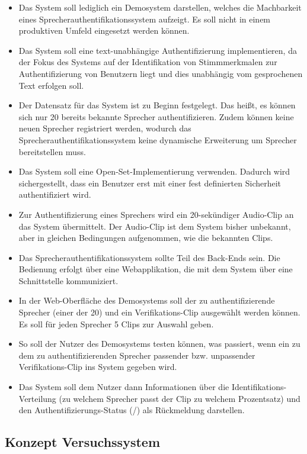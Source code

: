 \begin{itemize}
    \item Das System soll lediglich ein Demosystem darstellen, welches die Machbarkeit eines Sprecherauthentifikationssystem aufzeigt. Es soll nicht in einem produktiven Umfeld eingesetzt werden können.
    \item Das System soll eine text-unabhängige Authentifizierung implementieren, da der Fokus des Systems auf der Identifikation von Stimmmerkmalen zur Authentifizierung von Benutzern liegt und dies unabhängig vom gesprochenen Text erfolgen soll.
    \item Der Datensatz für das System ist zu Beginn festgelegt. Das heißt, es können sich nur 20 bereits bekannte Sprecher authentifizieren. Zudem können keine neuen Sprecher registriert werden, wodurch das Sprecherauthentifikationssystem keine dynamische Erweiterung um Sprecher bereitstellen muss.
    \item Das System soll eine Open-Set-Implementierung verwenden. Dadurch wird sichergestellt, dass ein Benutzer erst mit einer fest definierten Sicherheit authentifiziert wird.
    \item Zur Authentifizierung eines Sprechers wird ein 20-sekündiger Audio-Clip an das System übermittelt. Der Audio-Clip ist dem System bisher unbekannt, aber in gleichen Bedingungen aufgenommen, wie die bekannten Clips.
    \item Das Sprecherauthentifikationssystem sollte Teil des Back-Ends sein. Die Bedienung erfolgt über eine Webapplikation, die mit dem System über eine Schnittstelle kommuniziert.
    \item In der Web-Oberfläche des Demosystems soll der zu authentifizierende Sprecher (einer der 20) und ein Verifikations-Clip ausgewählt werden können. Es soll für jeden Sprecher 5 Clips zur Auswahl geben.
    \item So soll der Nutzer des Demosystems testen können, was passiert, wenn ein zu dem zu authentifizierenden Sprecher passender bzw. unpassender Verifikations-Clip ins System gegeben wird.
    \item Das System soll dem Nutzer dann Informationen über die Identifikations-Verteilung (zu welchem Sprecher passt der Clip zu welchem Prozentsatz) und den Authentifizierungs-Status (/) als Rückmeldung darstellen.
\end{itemize}

\subsection{Konzept Versuchssystem}


